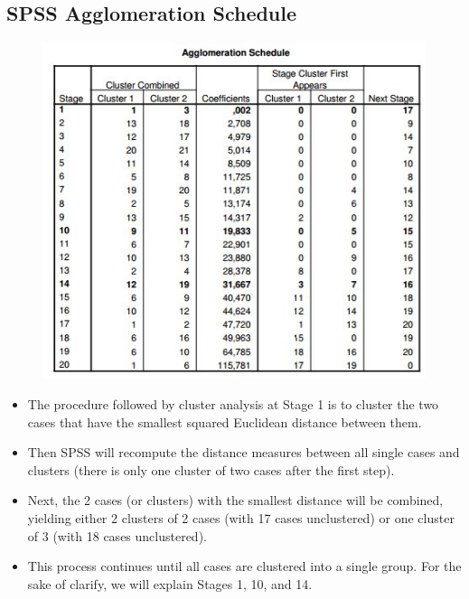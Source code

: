 \documentclass[a4paper,12pt]{article}
\begin{document}
\subsection{SPSS Agglomeration Schedule}
\begin{center}
	\begin{figure}[h!]
		\includegraphics[scale=1.1]{images/AggloSc}\\
	\end{figure}
\end{center}
\begin{itemize}
	\item The procedure followed by cluster analysis at Stage 1 is to cluster the two cases that have the smallest
	squared Euclidean distance between them.
	\item  Then SPSS will recompute the distance measures between all
	single cases and clusters (there is only one cluster of two cases after the first step). 
	\item Next, the 2 cases (or
	clusters) with the smallest distance will be combined, yielding either 2 clusters of 2 cases (with 17 cases
	unclustered) or one cluster of 3 (with 18 cases unclustered). 
	\item  This process continues until all cases are clustered into a single group.
	For the sake of clarify, we will explain Stages 1, 10, and 14.
\end{itemize}
\end{document}
